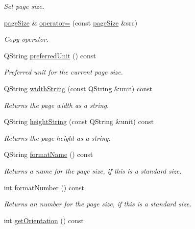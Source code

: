 \begin{DoxyCompactItemize}
\begin{DoxyCompactList}\small\item\em Set page size. \end{DoxyCompactList}\item 
\hyperlink{classpageSize}{page\+Size} \& \hyperlink{classpageSize_a1dcae891d98d8fe50e0c53c63fa76130}{operator=} (const \hyperlink{classpageSize}{page\+Size} \&src)
\begin{DoxyCompactList}\small\item\em Copy operator. \end{DoxyCompactList}\item 
Q\+String \hyperlink{classpageSize_a56c7c5e8cb55631ba45717e55f86c14b}{preferred\+Unit} () const 
\begin{DoxyCompactList}\small\item\em Preferred unit for the current page size. \end{DoxyCompactList}\item 
Q\+String \hyperlink{classpageSize_a06f628c0af2ee7d93f0cf7a8b07e7b05}{width\+String} (const Q\+String \&unit) const 
\begin{DoxyCompactList}\small\item\em Returns the page width as a string. \end{DoxyCompactList}\item 
Q\+String \hyperlink{classpageSize_a11875d7200f7d354583e653fe284b570}{height\+String} (const Q\+String \&unit) const 
\begin{DoxyCompactList}\small\item\em Returns the page height as a string. \end{DoxyCompactList}\item 
Q\+String \hyperlink{classpageSize_a22f33abf19e5ecc3d104ecb5be04e2cf}{format\+Name} () const 
\begin{DoxyCompactList}\small\item\em Returns a name for the page size, if this is a standard size. \end{DoxyCompactList}\item 
int \hyperlink{classpageSize_a19307e927d2e43e8153046bb4ede3fd2}{format\+Number} () const 
\begin{DoxyCompactList}\small\item\em Returns an number for the page size, if this is a standard size. \end{DoxyCompactList}\item 
int \hyperlink{classpageSize_a6ca490a7f4d0960bda88a1f54f6f9f19}{get\+Orientation} () const 

\end{DoxyCompactItemize}
